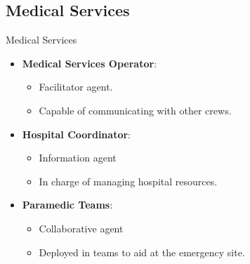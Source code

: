 \subsection{Medical Services}
\begin{frame}{Medical Services}
    \begin{itemize}
        \item \textbf{Medical Services Operator}: 
        \begin{itemize}
            \item \alert{Facilitator} agent.
            \item Capable of \alert{communicating} with other crews.
        \end{itemize}
        \item \textbf{Hospital Coordinator}: 
        \begin{itemize}
            \item \alert{Information} agent
            \item In charge of \alert{managing} hospital \alert{resources}.
        \end{itemize}
        \item \textbf{Paramedic Teams}: 
        \begin{itemize}
            \item \alert{Collaborative} agent
            \item Deployed in \alert{teams} to aid at the emergency site.
        \end{itemize}
    \end{itemize}
\end{frame} 